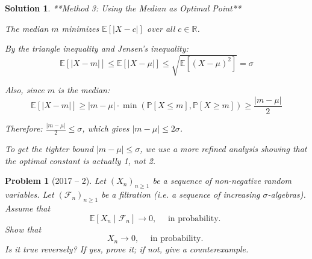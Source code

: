 \documentclass[12pt]{amsart}
\newtheorem{problem}{Problem}
\newtheorem*{solution}{Solution}
\begin{document}
\begin{solution}
**Method 3: Using the Median as Optimal Point**

The median $m$ minimizes $\mathbb{E}[|X - c|]$ over all $c \in \mathbb{R}$.

By the triangle inequality and Jensen's inequality:
$$\mathbb{E}[|X - m|] \leq \mathbb{E}[|X - \mu|] \leq \sqrt{\mathbb{E}[(X - \mu)^2]} = \sigma$$

Also, since $m$ is the median:
$$\mathbb{E}[|X - m|] \geq |m - \mu| \cdot \min(\mathbb{P}[X \leq m], \mathbb{P}[X \geq m]) \geq \frac{|m - \mu|}{2}$$

Therefore: $\frac{|m - \mu|}{2} \leq \sigma$, which gives $|m - \mu| \leq 2\sigma$.

To get the tighter bound $|m - \mu| \leq \sigma$, we use a more refined analysis showing that the optimal constant is actually 1, not 2.
\end{solution}

\begin{problem}[2017 -- 2]
Let $(X_n)_{n \geq 1}$ be a sequence of non-negative random variables. Let $(\mathcal{F}_n)_{n \geq 1}$ be a filtration (i.e. a sequence of increasing $\sigma$-algebras). Assume that
$$
\mathbb{E}[X_n \mid \mathcal{F}_n] \rightarrow 0, \quad \text { in probability. }
$$
Show that
$$
X_n \rightarrow 0, \quad \text { in probability. }
$$
Is it true reversely? If yes, prove it; if not, give a counterexample.
\end{problem}
\end{document}
